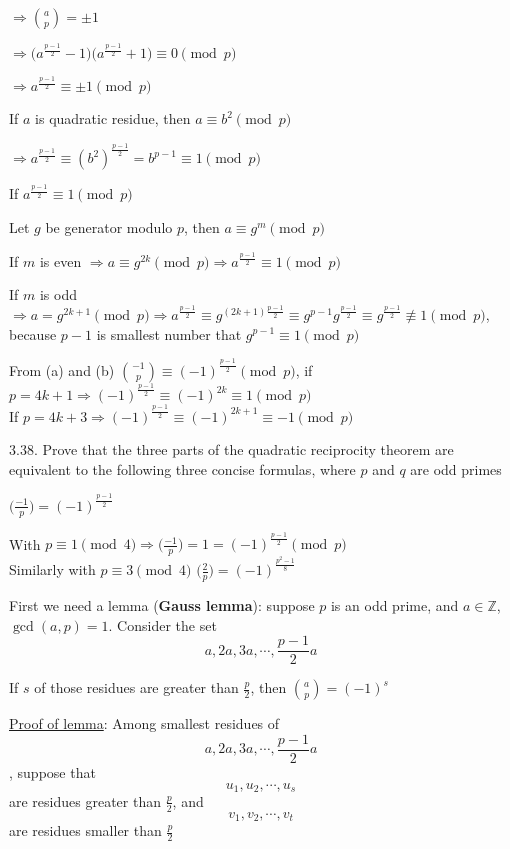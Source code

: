 $\Rightarrow \binom{a}{p} = \pm 1$

$\Rightarrow \Big(a^{\frac{p-1}{2}} - 1\Big)\Big(a^{\frac{p-1}{2}} + 1\Big) \equiv 0 \pmod p$

$\Rightarrow a^{\frac{p-1}{2}} \equiv \pm 1 \pmod p$
	 
If $a$ is quadratic residue, then $a \equiv b^2 \pmod p$ 

$\Rightarrow a^{\frac{p-1}{2}} \equiv (b^2)^{\frac{p-1}{2}} = b^{p-1} \equiv 1 \pmod p$

If $a^{\frac{p-1}{2}} \equiv 1 \pmod p$

Let $g$ be generator modulo $p$, then $a \equiv g^m \pmod p$

If $m$ is even $\Rightarrow a \equiv g^{2k} \pmod p \Rightarrow a^{\frac{p-1}{2}} \equiv 1 \pmod p$

If $m$ is odd $\Rightarrow a = g^{2k+1} \pmod p \Rightarrow a^{\frac{p-1}{2}} \equiv g^{(2k+1)\frac{p-1}{2}} \equiv g^{p-1} g^{\frac{p-1}{2}} \equiv g^{\frac{p-1}{2}}\not\equiv 1 \pmod p$, because $p-1$ is smallest number that $g^{p-1} \equiv 1 \pmod p$

From (a) and (b) $\binom{-1}{p} \equiv (-1)^{\frac{p-1}{2}} \pmod p$, if $p=4k+1 \Rightarrow (-1)^{\frac{p-1}{2}} \equiv (-1)^{2k} \equiv 1 \pmod p$ \\ If $p=4k+3 \Rightarrow (-1)^{\frac{p-1}{2}} \equiv (-1)^{2k+1} \equiv -1 \pmod p$

3.38. Prove that the three parts of the quadratic reciprocity theorem are equivalent to the following three concise formulas, where $p$ and $q$ are odd primes

		 $\Big(\frac{-1}{p}\Big) = (-1)^{\frac{p-1}{2}}$
		
		With $p \equiv 1 \pmod 4 \Rightarrow \Big(\frac{-1}{p}\Big) = 1 = (-1)^{\frac{p-1}{2}} \pmod p$ \\ Similarly with $p \equiv 3 \pmod 4$
		 $\Big(\frac{2}{p}\Big) = (-1)^{\frac{p^2-1}{8}}$
		
		First we need a lemma (\textbf{Gauss lemma}): suppose $p$ is an odd prime, and $a \in \mathbb{Z}$, $\gcd(a, p) = 1$. Consider the set
		\[a, 2a, 3a, \cdots, \frac{p-1}{2}a\]
		
		If $s$ of those residues are greater than $\frac{p}{2}$, then $\binom{a}{p} = (-1)^s$
		
		\underline{Proof of lemma}: Among smallest residues of 
		\[a, 2a, 3a, \cdots, \frac{p-1}{2}a\], suppose that 
		\[u_1, u_2, \cdots, u_s\] are residues greater than $\frac{p}{2}$, and 
		\[v_1, v_2, \cdots, v_t\] are residues smaller than $\frac{p}{2}$
		
